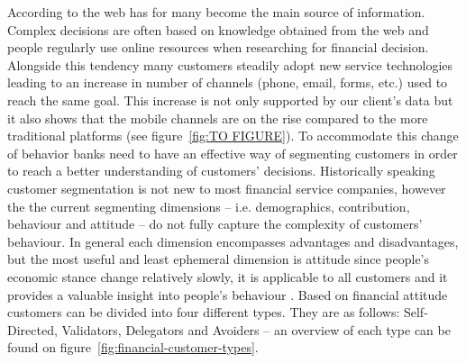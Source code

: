 According to \cite{ensor2006segmenting} the web has for many become the main source of information. Complex decisions are often based on knowledge obtained from the web and people regularly use online resources when researching for financial decision. Alongside this tendency many customers steadily adopt new service technologies leading to an increase in number of channels (phone, email, forms, etc.) used to reach the same goal. This increase is not only supported by our client’s data but it also shows that the mobile channels are on the rise compared to the more traditional platforms (see figure~\ref{fig:TO FIGURE}). To accommodate this change of behavior banks need to have an effective way of segmenting customers in order to reach a better understanding of customers’ decisions. Historically speaking customer segmentation is not new to most financial service companies, however the the current segmenting dimensions -- i.e. demographics, contribution, behaviour and attitude -- do not fully capture the complexity of customers’ behaviour. In general each dimension encompasses advantages and disadvantages, but the most useful and least ephemeral dimension is attitude since people's economic stance change relatively slowly, it is applicable to all customers and it provides a valuable insight into people’s behaviour \cite[p.~2-8]{ensor2006segmenting}. Based on financial attitude customers can be divided into four different types. They are as follows: Self-Directed, Validators, Delegators and Avoiders – an overview of each type can be found on figure~\ref{fig:financial-customer-types}.
